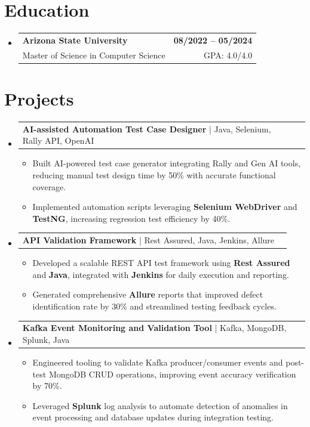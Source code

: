 \documentclass[letterpaper,11pt]{article}
\makeatletter
\newcommand{\resumeItem}[1]{
  \item\footnotesize{
    {#1 \vspace{-2pt}}
  }
}
\newcommand{\educationSubheading}[4]{
  \vspace{-2pt}\item
    \begin{tabular*}{1.0\textwidth}[t]{l@{\extracolsep{\fill}}r}
      \textbf{\small #1} & \textbf{\small #2} \\
      {\small#3} & {\small #4} \\
    \end{tabular*}\vspace{-7pt}
}
\newcommand{\resumeProjectHeading}[2]{
    \item
    \begin{tabular*}{1.001\textwidth}{l@{\extracolsep{\fill}}r}
      \small#1 & \textbf{\small #2}\\
    \end{tabular*}\vspace{-7pt}
}
\newcommand{\resumeSubHeadingListStart}{\begin{itemize}[leftmargin=0pt, label={}]}
\newcommand{\resumeSubHeadingListEnd}{\end{itemize}}
\newcommand{\resumeItemListStart}{\begin{itemize}[leftmargin=*]}
\newcommand{\resumeItemListEnd}{\end{itemize}\vspace{-5pt}}
\makeatother
\begin{document}
\section{Education}
  \resumeSubHeadingListStart
    \educationSubheading
      {Arizona State University}{08/2022 -- 05/2024}
      {Master of Science in Computer Science}{GPA: 4.0/4.0}
  \resumeSubHeadingListEnd
\vspace{-10pt}
  
\section{Projects}
    \vspace{-5pt}
    \resumeSubHeadingListStart
      \resumeProjectHeading
          {\textbf{AI-assisted Automation Test Case Designer} | Java, Selenium, Rally API, OpenAI}{}
          \resumeItemListStart
              \resumeItem{Built AI-powered test case generator integrating Rally and Gen AI tools, reducing manual test design time by 50\% with accurate functional coverage.}
              \resumeItem{Implemented automation scripts leveraging \textbf{Selenium WebDriver} and \textbf{TestNG}, increasing regression test efficiency by 40\%.}
          \resumeItemListEnd
          \vspace{-12pt}
      \resumeProjectHeading
          {\textbf{API Validation Framework} | Rest Assured, Java, Jenkins, Allure}{}
          \resumeItemListStart
              \resumeItem{Developed a scalable REST API test framework using \textbf{Rest Assured} and \textbf{Java}, integrated with \textbf{Jenkins} for daily execution and reporting.}
              \resumeItem{Generated comprehensive \textbf{Allure} reports that improved defect identification rate by 30\% and streamlined testing feedback cycles.}
          \resumeItemListEnd
          \vspace{-12pt}
      \resumeProjectHeading
          {\textbf{Kafka Event Monitoring and Validation Tool} | Kafka, MongoDB, Splunk, Java}{}
          \resumeItemListStart
              \resumeItem{Engineered tooling to validate Kafka producer/consumer events and post-test MongoDB CRUD operations, improving event accuracy verification by 70\%.}
              \resumeItem{Leveraged \textbf{Splunk} log analysis to automate detection of anomalies in event processing and database updates during integration testing.}
          \resumeItemListEnd
    \resumeSubHeadingListEnd
\end{document}
